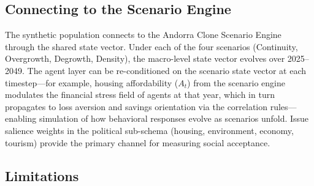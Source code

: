 \documentclass[a4paper,12pt]{article}
\begin{document}
\subsection{Connecting to the Scenario Engine}
\label{subsec:connection_to_scenarios}

The synthetic population connects to the Andorra Clone Scenario
Engine~\cite{bartumeu2026andorra} through the shared state vector. Under
each of the four scenarios (Continuity, Overgrowth, Degrowth, Density),
the macro-level state vector evolves over 2025--2049. The agent layer can
be re-conditioned on the scenario state vector at each timestep---for
example, housing affordability ($A_t$) from the scenario engine modulates
the financial stress field of agents at that year, which in turn propagates
to loss aversion and savings orientation via the correlation rules---enabling
simulation of how behavioral responses evolve as scenarios unfold. Issue
salience weights in the political sub-schema (housing, environment, economy,
tourism) provide the primary channel for measuring social acceptance.

\subsection{Limitations}
\label{subsec:limitations}
\end{document}
